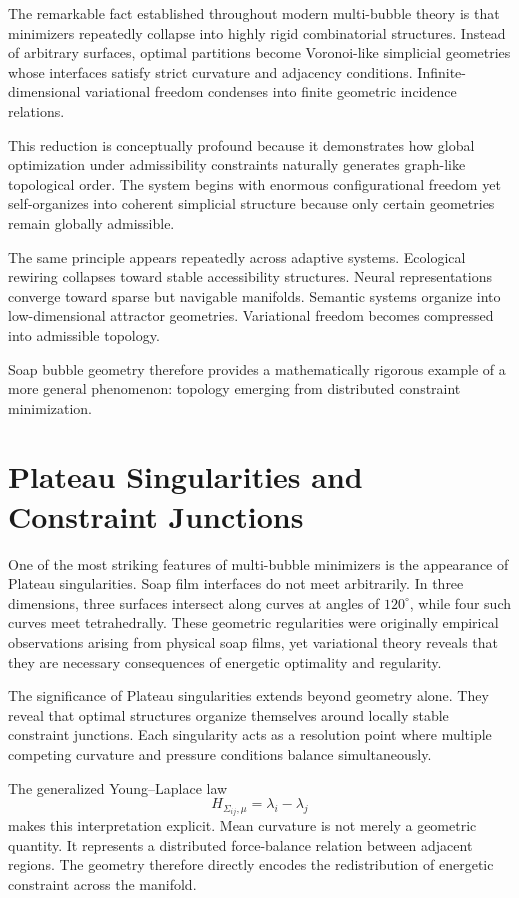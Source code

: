 \documentclass[11pt,a4paper]{article}
\begin{document}
The remarkable fact established throughout modern multi-bubble theory is that minimizers repeatedly collapse into highly rigid combinatorial structures. Instead of arbitrary surfaces, optimal partitions become Voronoi-like simplicial geometries whose interfaces satisfy strict curvature and adjacency conditions. Infinite-dimensional variational freedom condenses into finite geometric incidence relations.

This reduction is conceptually profound because it demonstrates how global optimization under admissibility constraints naturally generates graph-like topological order. The system begins with enormous configurational freedom yet self-organizes into coherent simplicial structure because only certain geometries remain globally admissible.

The same principle appears repeatedly across adaptive systems. Ecological rewiring collapses toward stable accessibility structures. Neural representations converge toward sparse but navigable manifolds. Semantic systems organize into low-dimensional attractor geometries. Variational freedom becomes compressed into admissible topology.

Soap bubble geometry therefore provides a mathematically rigorous example of a more general phenomenon: topology emerging from distributed constraint minimization.

\newpage

\section{Plateau Singularities and Constraint Junctions}

One of the most striking features of multi-bubble minimizers is the appearance of Plateau singularities. Soap film interfaces do not meet arbitrarily. In three dimensions, three surfaces intersect along curves at angles of $120^\circ$, while four such curves meet tetrahedrally. These geometric regularities were originally empirical observations arising from physical soap films, yet variational theory reveals that they are necessary consequences of energetic optimality and regularity.

The significance of Plateau singularities extends beyond geometry alone. They reveal that optimal structures organize themselves around locally stable constraint junctions. Each singularity acts as a resolution point where multiple competing curvature and pressure conditions balance simultaneously.

The generalized Young--Laplace law
\[
H_{\Sigma_{ij},\mu}
=
\lambda_i-\lambda_j
\]
makes this interpretation explicit. Mean curvature is not merely a geometric quantity. It represents a distributed force-balance relation between adjacent regions. The geometry therefore directly encodes the redistribution of energetic constraint across the manifold.
\end{document}
